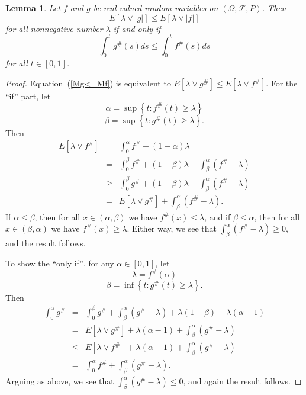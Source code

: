 \documentclass[12pt]{amsart}
\newtheorem{lem}[thm]{Lemma}
\begin{document}
\begin{lem}
\label{l Mg<=Mf}
Let $f$ and $g$ be real-valued random variables on
$(\Omega ,\mathcal{F},P)$.  Then
\begin{equation}
\label{Mg<=Mf} E \left[ \lambda \vee |g| \right]\leq
E\left[\lambda \vee |f| \right]
\end{equation}
for all nonnegative number $\lambda$  if and only if
\[\int_0^t g^{\#}(s) ds\leq \int_0^t f^{\#}(s) ds \]
for all $t\in [0,1]$.
\end{lem}

\begin{proof}
Equation~(\ref{Mg<=Mf}) is equivalent to $E \left[ \lambda \vee
g^\#  \right] \leq E \left[\lambda \vee f^\# \right]$. For the
``if'' part, let
\[\alpha =\sup \left\{t:f^\# (t) \geq \lambda \right\}\]
\[\beta =\sup \left\{t:g^\# (t)\geq \lambda \right\}.\]
Then
\begin{eqnarray*}
E \left[ \lambda \vee f^\#\right] &=&
\int_0^\alpha f^\#  + (1-\alpha)\lambda \\
&=&
\int_0^\beta f^\# + (1-\beta)\lambda + \int_\beta^\alpha (f^\#-\lambda) \\
&\ge&
\int_0^\beta g^\# + (1-\beta)\lambda + \int_\beta^\alpha (f^\#-\lambda) \\
&=& E \left[ \lambda \vee g^\# \right] + \int_\beta^\alpha
(f^\#-\lambda) .
\end{eqnarray*}
If $\alpha \le \beta$, then for all $x \in (\alpha,\beta)$ we have
$f^\#(x) \le \lambda$, and if $\beta \le \alpha$, then for all $x
\in (\beta,\alpha)$ we have $f^\#(x) \ge \lambda$.  Either way, we
see that $\int_\beta^\alpha (f^\#-\lambda) \ge 0$, and the result
follows.

To show the ``only if'', for any $\alpha \in [0,1]$, let
\[\lambda=f^\#(\alpha)\]
\[\beta =\inf \left\{t:g^\# (t)\geq \lambda \right\}.\]
Then
\begin{eqnarray*}
\int_0^\alpha g^\#
&=&
\int_0^\beta g^\# + \int_\beta^\alpha (g^\#-\lambda) + \lambda(1-\beta) + \lambda(\alpha-1) \\
&=&
E \left[ \lambda \vee g^\# \right] + \lambda(\alpha-1) + \int_\beta^\alpha (g^\#-\lambda) \\
&\le&
E \left[ \lambda \vee f^\# \right] + \lambda(\alpha-1) + \int_\beta^\alpha (g^\#-\lambda) \\
&=& \int_0^\alpha f^\# + \int_\beta^\alpha (g^\#-\lambda) .
\end{eqnarray*}
Arguing as above, we see that $\int_\beta^\alpha (g^\#-\lambda)
\le 0$, and again the result follows.
\end{proof}
\end{document}
